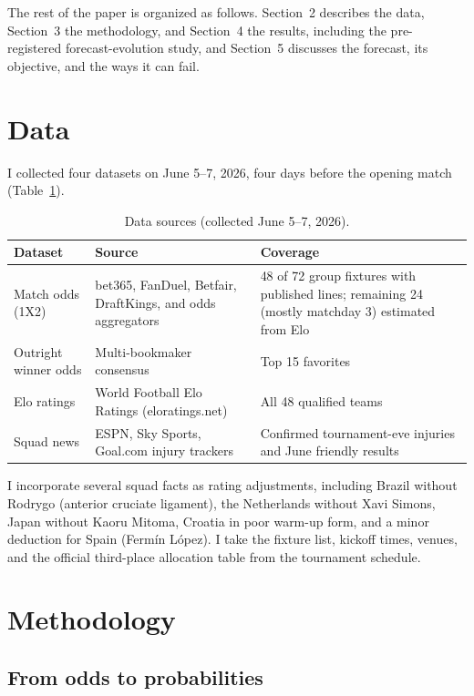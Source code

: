 \documentclass[11pt,a4paper]{article}
\begin{document}
The rest of the paper is organized as follows. Section~2 describes the data, Section~3 the methodology, and Section~4 the results, including the pre-registered forecast-evolution study, and Section~5 discusses the forecast, its objective, and the ways it can fail.

\section{Data}

I collected four datasets on June 5--7, 2026, four days before the opening match (Table~\ref{tab:data}).

\begin{table}[ht]
\centering\small
\caption{Data sources (collected June 5--7, 2026).}
\label{tab:data}
\begin{tabular}{p{3.4cm}p{5.2cm}p{5.6cm}}
\toprule
Dataset & Source & Coverage \\
\midrule
Match odds (1X2) & bet365, FanDuel, Betfair, DraftKings, and odds aggregators & 48 of 72 group fixtures with published lines; remaining 24 (mostly matchday 3) estimated from Elo \\
Outright winner odds & Multi-bookmaker consensus & Top 15 favorites \\
Elo ratings & World Football Elo Ratings (eloratings.net) & All 48 qualified teams \\
Squad news & ESPN, Sky Sports, Goal.com injury trackers & Confirmed tournament-eve injuries and June friendly results \\
\bottomrule
\end{tabular}
\end{table}

I incorporate several squad facts as rating adjustments, including Brazil without Rodrygo (anterior cruciate ligament), the Netherlands without Xavi Simons, Japan without Kaoru Mitoma, Croatia in poor warm-up form, and a minor deduction for Spain (Fermín López). I take the fixture list, kickoff times, venues, and the official third-place allocation table from the tournament schedule.

\section{Methodology}

\subsection{From odds to probabilities}
\end{document}
